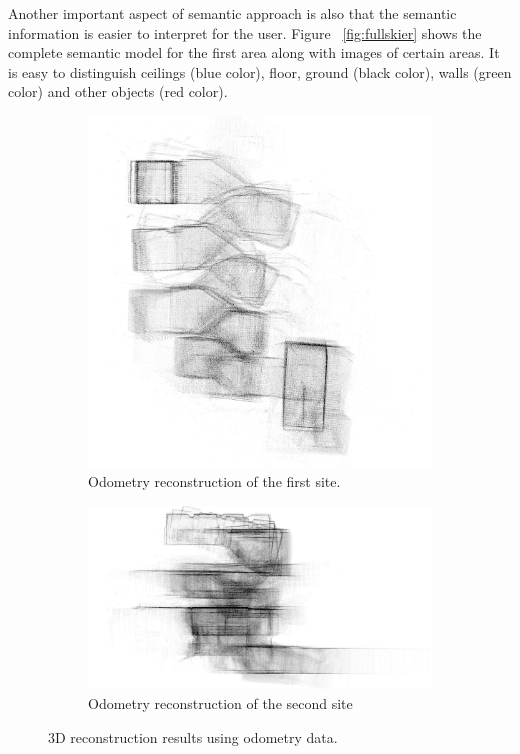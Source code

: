 \documentclass{article}
\begin{document}
Another important aspect of semantic approach is also that the semantic information is easier to interpret for the user.
Figure ~\ref{fig:fullskier} shows the complete semantic model for the first area along with images of certain areas.
It is easy to distinguish ceilings (blue color), floor, ground (black color), walls (green color) and other objects (red color).
\begin{figure} [h]
	\centering
	\begin{subfigure} [b]{0.4\textwidth}
        \centering
        \includegraphics[width=\textwidth]{ROB-15-0035_fig28a.png}
        \caption{Odometry reconstruction of the first site.}
   \end{subfigure}
   \begin{subfigure} [b]{0.59\textwidth}
        \centering
        \includegraphics[width=\textwidth]{ROB-15-0035_fig28b.png}
        \caption{Odometry reconstruction of the second site}
   \end{subfigure}
   \caption{3D reconstruction results using odometry data.}
   \label{fig:comparisonLocation1}
\end{figure}
\end{document}
